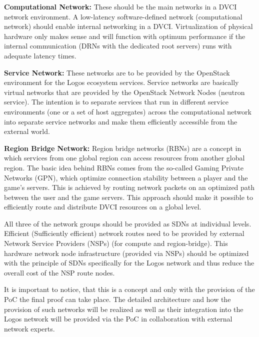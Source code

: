 \documentclass[]{article}
\begin{document}
\textbf{Computational Network:}
These should be the main networks in a DVCI network environment.  
A low-latency software-defined network (computational network) should enable internal networking in a DVCI.  
Virtualization of physical hardware only makes sense and will function with optimum performance if the internal communication (DRNs with the dedicated root servers) runs with adequate latency times.
\newline

\textbf{Service Network:}
These networks are to be provided by the OpenStack environment for the Logos ecosystem services. 
Service networks are basically virtual networks that are provided by the OpenStack Network Nodes (neutron service). 
The intention is to separate services that run in different service environments (one or a set of host aggregates) across the computational network into separate service networks and make them efficiently accessible from the external world.
\newline

\textbf{Region Bridge Network:}
Region bridge networks (RBNs) are a concept in which services from one global region can access resources from another global region.
The basic idea behind RBNs comes from the so-called Gaming Private Networks (GPN), which optimize connection stability between a player and the game's servers. 
This is achieved by routing network packets on an optimized path between the user and the game servers.
This approach should make it possible to efficiently route and distribute DVCI resources on a global level.
\newline

All three of the network groups should be provided as SDNs at individual levels. 
Efficient (Sufficiently efficient) network routes need to be provided by external Network Service Providers (NSPs) (for compute and region-bridge). 
This hardware network node infrastructure (provided via NSPs) should be optimized with the principle of SDNs specifically for the Logos network and thus reduce the overall cost of the NSP route nodes.  

It is important to notice, that this is a concept and only with the provision of the PoC the final proof can take place.
The detailed architecture and how the provision of such networks will be realized as well as their integration into the Logos network will be provided via the PoC in collaboration with external network experts.
\end{document}
